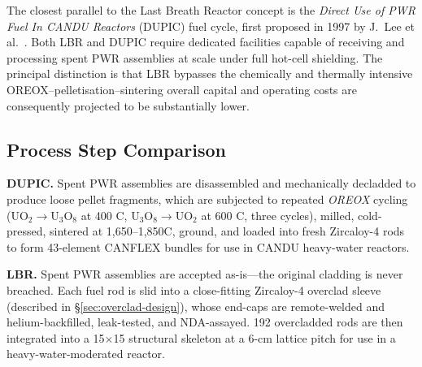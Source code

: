 The closest parallel to the Last Breath Reactor concept is the \textit{Direct Use of PWR Fuel In CANDU Reactors} (DUPIC) fuel cycle, first proposed in 1997 by J.~Lee et al.~\cite{LeeTHEHWR}. Both LBR and DUPIC require dedicated facilities capable of receiving and processing spent PWR assemblies at scale under full hot-cell shielding. The principal distinction is that LBR bypasses the chemically and thermally intensive OREOX--pelletisation--sintering overall capital and operating costs are consequently projected to be substantially lower.

\subsection{Process Step Comparison}

\noindent\textbf{DUPIC.}\;
Spent PWR assemblies are disassembled and mechanically decladded to
produce loose pellet fragments, which are subjected to repeated
\textit{OREOX} cycling
(UO$_2\!\to$U$_3$O$_8$ at 400 \textdegree C,
U$_3$O$_8\!\to$UO$_2$ at 600 \textdegree C, three cycles),
milled, cold-pressed, sintered at 1,650--1,850\textdegree C, ground, and loaded into fresh Zircaloy-4 rods to form
43-element CANFLEX bundles for use in CANDU heavy-water reactors.

\medskip
\noindent\textbf{LBR.}\;
Spent PWR assemblies are accepted as-is---the original cladding is never breached. Each fuel rod is slid into a close-fitting Zircaloy-4 overclad sleeve (described in \S\ref{sec:overclad-design}), whose end-caps are remote-welded and helium-backfilled, leak-tested, and NDA-assayed. 192 overcladded rods are then integrated into a 15$\times$15 structural skeleton at a 6-cm lattice pitch for use in a heavy-water-moderated reactor.

